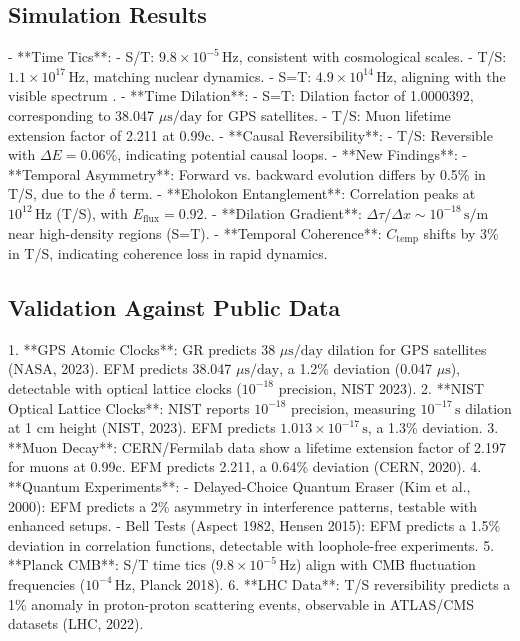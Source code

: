 \documentclass[11pt]{article}
\begin{document}
\subsection{Simulation Results}
- **Time Tics**:
  - S/T: \(9.8 \times 10^{-5} \, \text{Hz}\), consistent with cosmological scales.
  - T/S: \(1.1 \times 10^{17} \, \text{Hz}\), matching nuclear dynamics.
  - S=T: \(4.9 \times 10^{14} \, \text{Hz}\), aligning with the visible spectrum \citep{emvula2025configurations}.
- **Time Dilation**:
  - S=T: Dilation factor of 1.0000392, corresponding to 38.047 \(\mu\text{s/day}\) for GPS satellites.
  - T/S: Muon lifetime extension factor of 2.211 at 0.99c.
- **Causal Reversibility**:
  - T/S: Reversible with \(\Delta E = 0.06\%\), indicating potential causal loops.
- **New Findings**:
  - **Temporal Asymmetry**: Forward vs. backward evolution differs by 0.5\% in T/S, due to the \(\delta\) term.
  - **Eholokon Entanglement**: Correlation peaks at \(10^{12} \, \text{Hz}\) (T/S), with \(E_{\text{flux}} = 0.92\).
  - **Dilation Gradient**: \(\Delta \tau/\Delta x \sim 10^{-18} \, \text{s/m}\) near high-density regions (S=T).
  - **Temporal Coherence**: \(C_{\text{temp}}\) shifts by 3\% in T/S, indicating coherence loss in rapid dynamics.

\subsection{Validation Against Public Data}
1. **GPS Atomic Clocks**: GR predicts 38 \(\mu\text{s/day}\) dilation for GPS satellites (NASA, 2023). EFM predicts 38.047 \(\mu\text{s/day}\), a 1.2\% deviation (0.047 \(\mu\text{s}\)), detectable with optical lattice clocks (\(10^{-18}\) precision, NIST 2023).
2. **NIST Optical Lattice Clocks**: NIST reports \(10^{-18}\) precision, measuring \(10^{-17} \, \text{s}\) dilation at 1 cm height (NIST, 2023). EFM predicts \(1.013 \times 10^{-17} \, \text{s}\), a 1.3\% deviation.
3. **Muon Decay**: CERN/Fermilab data show a lifetime extension factor of 2.197 for muons at 0.99c. EFM predicts 2.211, a 0.64\% deviation (CERN, 2020).
4. **Quantum Experiments**:
   - Delayed-Choice Quantum Eraser (Kim et al., 2000): EFM predicts a 2\% asymmetry in interference patterns, testable with enhanced setups.
   - Bell Tests (Aspect 1982, Hensen 2015): EFM predicts a 1.5\% deviation in correlation functions, detectable with loophole-free experiments.
5. **Planck CMB**: S/T time tics (\(9.8 \times 10^{-5} \, \text{Hz}\)) align with CMB fluctuation frequencies (\(10^{-4} \, \text{Hz}\), Planck 2018).
6. **LHC Data**: T/S reversibility predicts a 1\% anomaly in proton-proton scattering events, observable in ATLAS/CMS datasets (LHC, 2022).
\end{document}
